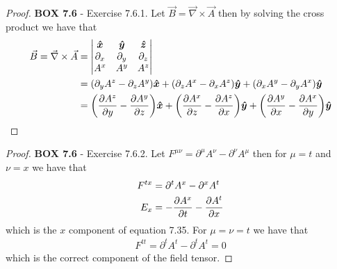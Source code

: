 \documentclass[11pt]{article}
\newcommand{\hatx}{\bm{\hat{x}}}
\newcommand{\haty}{\bm{\hat{y}}}
\newcommand{\hatz}{\bm{\hat{z}}}
\theoremstyle{definition}
\begin{document}
\begin{proof}{\textbf{BOX 7.6} - Exercise 7.6.1.}
    Let $\vec{B} = \vec\nabla \times \vec A$ then by solving the cross product
    we have that
    \begin{align*}
        \vec{B} = \vec\nabla \times \vec A
        &= \begin{vmatrix}
            \hatx & \haty & \hatz\\
            \partial_x & \partial_y & \partial_z\\
            A^x & A^y & A^z
        \end{vmatrix}\\
        &= (\partial_yA^z -  \partial_zA^y)\hatx
        + (\partial_zA^x - \partial_xA^z)\haty
        + (\partial_xA^y - \partial_yA^x)\haty\\
        &= \bigg(
            \partialderivative{A^z}{y} -  \partialderivative{A^y}{z}
        \bigg)\hatx
        + \bigg(
            \partialderivative{A^x}{z} - \partialderivative{A^z}{x}
        \bigg)\haty
        + \bigg(
            \partialderivative{A^y}{x} - \partialderivative{A^x}{y}
        \bigg)\haty
    \end{align*}
\end{proof}
\cleardoublepage
\begin{proof}{\textbf{BOX 7.6} - Exercise 7.6.2.}
    Let $F^{\mu\nu} = \partial^\mu A^\nu - \partial^\nu A^\mu$ then for
    $\mu = t$ and $\nu = x$ we have that
    \begin{align*}
        F^{tx} &= \partial^t A^x - \partial^x A^t\\
        E_x &= -\partialderivative{A^x}{t} - \partialderivative{A^t}{x}
    \end{align*}
    which is the $x$ component of equation 7.35.
    For $\mu = \nu = t$ we have that
    \begin{align*}
        F^{tt} = \partial^t A^t - \partial^t A^t = 0
    \end{align*}
    which is the correct component of the field tensor.
\end{proof}
\end{document}
